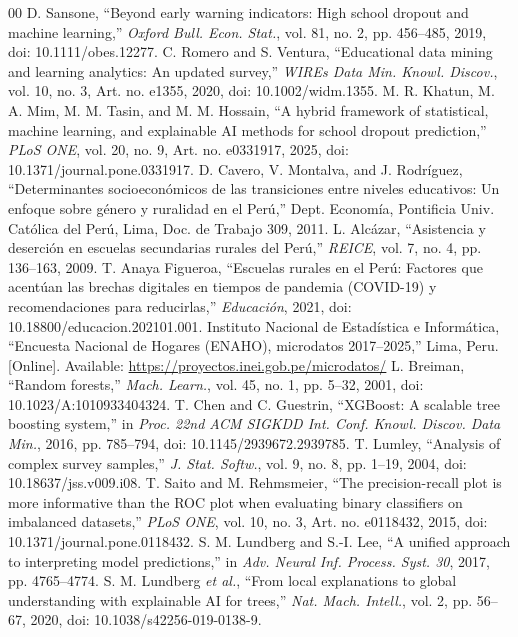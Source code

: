 \documentclass[conference]{IEEEtran}
\begin{document}
\begin{thebibliography}{00}
 D. Sansone, ``Beyond early warning indicators: High school dropout and machine learning,'' \textit{Oxford Bull. Econ. Stat.}, vol. 81, no. 2, pp. 456--485, 2019, doi: 10.1111/obes.12277.
 C. Romero and S. Ventura, ``Educational data mining and learning analytics: An updated survey,'' \textit{WIREs Data Min. Knowl. Discov.}, vol. 10, no. 3, Art. no. e1355, 2020, doi: 10.1002/widm.1355.
 M. R. Khatun, M. A. Mim, M. M. Tasin, and M. M. Hossain, ``A hybrid framework of statistical, machine learning, and explainable AI methods for school dropout prediction,'' \textit{PLoS ONE}, vol. 20, no. 9, Art. no. e0331917, 2025, doi: 10.1371/journal.pone.0331917.
 D. Cavero, V. Montalva, and J. Rodr\'iguez, ``Determinantes socioecon\'omicos de las transiciones entre niveles educativos: Un enfoque sobre g\'enero y ruralidad en el Per\'u,'' Dept. Econom\'ia, Pontificia Univ. Cat\'olica del Per\'u, Lima, Doc. de Trabajo 309, 2011.
 L. Alc\'azar, ``Asistencia y deserci\'on en escuelas secundarias rurales del Per\'u,'' \textit{REICE}, vol. 7, no. 4, pp. 136--163, 2009.
 T. Anaya Figueroa, ``Escuelas rurales en el Per\'u: Factores que acent\'uan las brechas digitales en tiempos de pandemia (COVID-19) y recomendaciones para reducirlas,'' \textit{Educaci\'on}, 2021, doi: 10.18800/educacion.202101.001.
 Instituto Nacional de Estad\'istica e Inform\'atica, ``Encuesta Nacional de Hogares (ENAHO), microdatos 2017--2025,'' Lima, Peru. [Online]. Available: \url{https://proyectos.inei.gob.pe/microdatos/}
 L. Breiman, ``Random forests,'' \textit{Mach. Learn.}, vol. 45, no. 1, pp. 5--32, 2001, doi: 10.1023/A:1010933404324.
 T. Chen and C. Guestrin, ``XGBoost: A scalable tree boosting system,'' in \textit{Proc. 22nd ACM SIGKDD Int. Conf. Knowl. Discov. Data Min.}, 2016, pp. 785--794, doi: 10.1145/2939672.2939785.
 T. Lumley, ``Analysis of complex survey samples,'' \textit{J. Stat. Softw.}, vol. 9, no. 8, pp. 1--19, 2004, doi: 10.18637/jss.v009.i08.
 T. Saito and M. Rehmsmeier, ``The precision-recall plot is more informative than the ROC plot when evaluating binary classifiers on imbalanced datasets,'' \textit{PLoS ONE}, vol. 10, no. 3, Art. no. e0118432, 2015, doi: 10.1371/journal.pone.0118432.
 S. M. Lundberg and S.-I. Lee, ``A unified approach to interpreting model predictions,'' in \textit{Adv. Neural Inf. Process. Syst. 30}, 2017, pp. 4765--4774.
 S. M. Lundberg \textit{et al.}, ``From local explanations to global understanding with explainable AI for trees,'' \textit{Nat. Mach. Intell.}, vol. 2, pp. 56--67, 2020, doi: 10.1038/s42256-019-0138-9.
\end{thebibliography}
\end{document}
